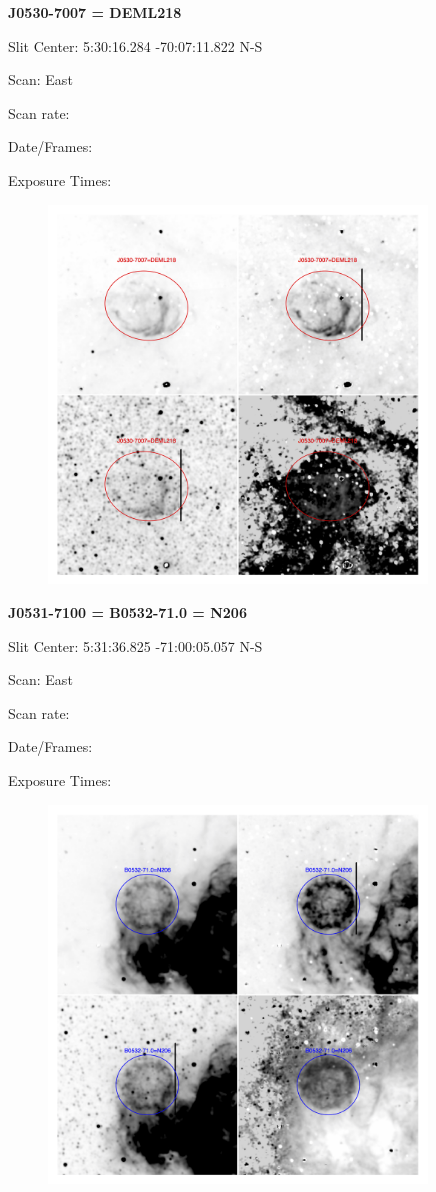\documentclass[11pt]{article}
\begin{document}
\newpage
{\bf J0530-7007 = DEML218}  
 
Slit Center:   5:30:16.284   -70:07:11.822 N-S

Scan:  East

Scan rate:  

Date/Frames:

Exposure Times:  

\begin{figure}
\includegraphics[width=10.05cm]{snapshots/J0530-7007.png}
\end{figure}

\newpage
{\bf J0531-7100 = B0532-71.0 = N206}  
 
Slit Center:   5:31:36.825   -71:00:05.057 N-S

Scan:  East

Scan rate:  

Date/Frames:

Exposure Times:  

\begin{figure}
\includegraphics[width=10.05cm]{snapshots/B0532-710.png}
\end{figure}
\end{document}
